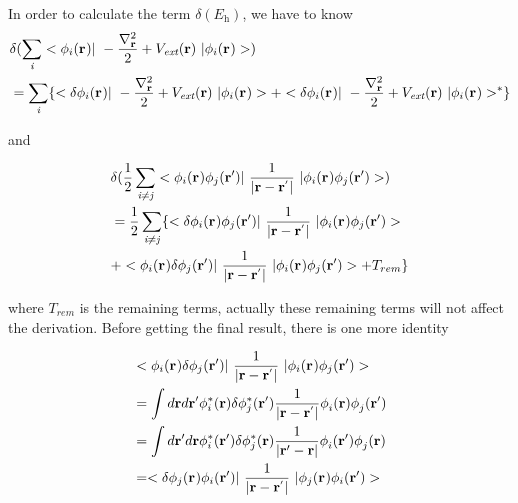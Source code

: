 \documentclass[a4paper]{report}
\begin{document}
\noindent In order to calculate the term $\delta ( E_{\textit{h}} ) $, we have to know
\begin{equation}\begin{split}\label{hartree1}
& \delta ( \sumi<i> <\bwf<i><> |\ -\frac{\nabla^{2}_{\textbf r}}{2} + V_\textit{ext}(\textbf{r})  \ | \bwf<i><> > ) \\
&  = \sumi<i> \{ < \delta \bwf<i><> |\ -\frac{\nabla^{2}_{\textbf r}}{2} + V_\textit{ext}(\textbf{r})  \ | \bwf<i><> >  
   + <  \delta \bwf<i><> |\ -\frac{\nabla^{2}_{\textbf r}}{2} + V_\textit{ext}(\textbf{r})  \ |  \bwf<i><> >^{\ast} \}
\end{split}\end{equation}

\noindent and 

\begin{equation}\begin{split}\label{hartree2}
&  \delta( \frac{1}{2} \suminj<i><j> <\bwf<i><> \bwfn<j><'>|\ \frac{1}{|\textbf{r} - \textbf{r}^{'} |} \ | \bwf<i><> \bwfn<j><'>>)   \\
& =   \frac{1}{2} \suminj<i><j> \{  <\delta \bwf<i><> \bwfn<j><'>|\ \frac{1}{|\textbf{r} - \textbf{r}^{'} |} \ | \bwf<i><> \bwfn<j><'>>  \\
& +   < \bwf<i><> \delta \bwfn<j><'>|\ \frac{1}{|\textbf{r} - \textbf{r}^{'} |} \ | \bwf<i><> \bwfn<j><'>> +  T_{rem}\}
\end{split}\end{equation}

\noindent where $T_{rem}$ is the remaining terms, actually these remaining terms will not affect the derivation. Before getting the final result, 
there is one more identity 

\begin{equation}\begin{split}\label{hartreelabel1}
& < \bwf<i><> \delta \bwfn<j><'>|\ \frac{1}{|\textbf{r} - \textbf{r}^{'} |} \ | \bwf<i><> \bwfn<j><'>> \\
& = \int d \textbf{r} d \textbf{r}{'}  \phi_{i}^{*} (\textbf{r}{}) \delta \phi_{j}^{*} (\textbf{r}{'}) \frac{1}{|\textbf{r} - \textbf{r}^{'} |}  \phi_{i}^{} (\textbf{r}{})  \phi_{j}^{} (\textbf{r}{'})\\
& = \int d \textbf{r}{'} d \textbf{r}  \phi_{i}^{*} (\textbf{r}{'}) \delta \phi_{j}^{*} (\textbf{r}{}) \frac{1}{|\textbf{r}{'} - \textbf{r} |}  \phi_{i}^{} (\textbf{r}{'})  \phi_{j}^{} (\textbf{r})\\
& = <\delta \bwf<j><> \bwfn<i><'>|\ \frac{1}{|\textbf{r} - \textbf{r}^{'} |} \ | \bwf<j><> \bwfn<i><'>>
\end{split}\end{equation}
\end{document}
